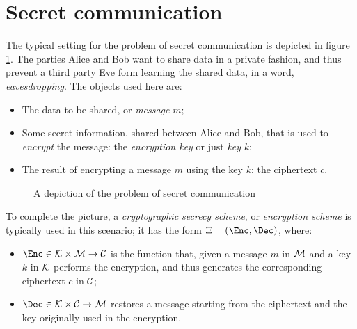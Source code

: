 
\section{Secret communication}

The typical setting for the problem of secret communication is depicted in figure \ref{fig:secrecy}. The parties Alice and Bob want to share data in a private fashion, and thus prevent a third party Eve form learning the shared data, in a word, \emph{eavesdropping}. The objects used here are:
\begin{itemize}
    \item The data to be shared, or \emph{message} $m$;
    \item Some secret information, shared between Alice and Bob, that is used to \emph{encrypt} the message: the \emph{encryption key} or just \emph{key} $k$;
    \item The result of encrypting a message $m$ using the key $k$: the ciphertext $c$.
\end{itemize}

\begin{figure}[ht]
    \centering

    \caption{A depiction of the problem of secret communication}
    \label{fig:secrecy}
\end{figure}

To complete the picture, a \emph{cryptographic secrecy scheme}, or \emph{encryption scheme} is typically used in this scenario; it has the form $\Xi = (\Enc, \Dec)$, where:
\begin{itemize}
    \item $\Enc \in \K \times \M \to \C$ is the function that, given a message $m$ in $\mathcal{M}$ and a key $k$ in $\mathcal{K}$ performs the encryption, and thus generates the corresponding ciphertext $c$ in $\mathcal{C}$;
    \item $\Dec \in \K \times \C \to \M$ restores a message starting from the ciphertext and the key originally used in the encryption.
\end{itemize}

